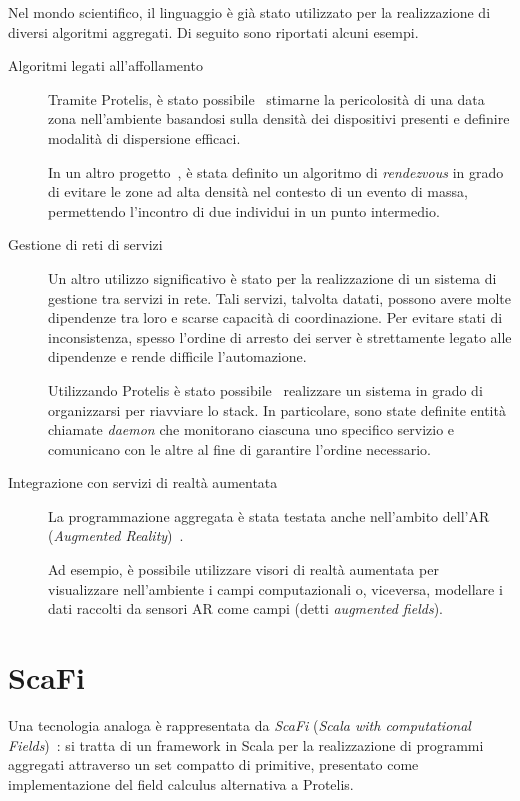 Nel mondo scientifico, il linguaggio è già stato utilizzato per la realizzazione di diversi algoritmi aggregati.
Di seguito sono riportati alcuni esempi.

\begin{description}
  \item[Algoritmi legati all'affollamento]
    Tramite Protelis, è stato possibile~\cite{7274429} stimarne la pericolosità di una data zona nell'ambiente basandosi sulla densità dei dispositivi presenti e definire modalità di dispersione efficaci.

    In un altro progetto~\cite{DBLP:journals/fgcs/CasadeiFPRSV19}, è stata definito un algoritmo di \emph{rendezvous} in grado di evitare le zone ad alta densità nel contesto di un evento di massa, permettendo l'incontro di due individui in un punto intermedio.

  \item[Gestione di reti di servizi]
    Un altro utilizzo significativo è stato per la realizzazione di un sistema di gestione tra servizi in rete.
    Tali servizi, talvolta datati, possono avere molte dipendenze tra loro e scarse capacità di coordinazione.
    Per evitare stati di inconsistenza, spesso l'ordine di arresto dei server è strettamente legato alle dipendenze e rende difficile l'automazione.

    Utilizzando Protelis è stato possibile~\cite{7306601} realizzare un sistema in grado di organizzarsi per riavviare lo stack.
    In particolare, sono state definite entità chiamate \emph{daemon} che monitorano ciascuna uno specifico servizio e comunicano con le altre al fine di garantire l'ordine necessario.

  \item[Integrazione con servizi di realtà aumentata]
    La programmazione aggregata è stata testata anche nell'ambito dell'AR (\emph{Augmented Reality})~\cite{PCRV-SCOPES2015}.

    Ad esempio, è possibile utilizzare visori di realtà aumentata per visualizzare nell'ambiente i campi computazionali
    o, viceversa, modellare i dati raccolti da sensori AR come campi (detti \emph{augmented fields}).
\end{description}

\section{ScaFi}\label{sec:scafi}

Una tecnologia analoga è rappresentata da \emph{ScaFi} (\emph{\emph{Sca}la with computational \emph{Fi}elds})~\cite{aggregatescala-pmldc2016}:
si tratta di un framework in Scala per la realizzazione di programmi aggregati attraverso un set compatto di primitive, presentato come implementazione del field calculus alternativa a Protelis.

